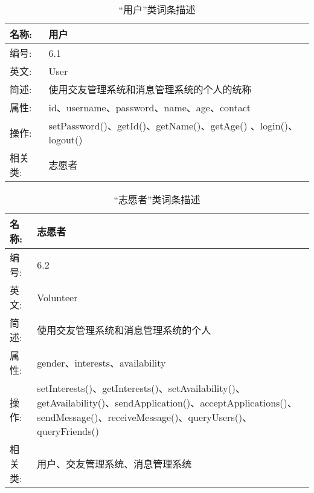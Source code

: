 \begin{table}[H]  
\caption{“用户”类词条描述}  
\begin{center}  
    \begin{tabular}{l p{11cm}} 
        \hline
        \quad 名称:  &  用户 \\
        \hline
        \quad 编号:  & 6.1 \\
        \hline
        \quad 英文:  &  User \\
        \hline
        \quad 简述:  & 使用交友管理系统和消息管理系统的个人的统称 \\
        \hline
        \quad 属性:  & id、username、password、name、age、contact \\
        \hline
        \quad 操作:  & setPassword()、getId()、getName()、getAge() 、login()、logout() \\
        \hline
        \quad 相关类:  & 志愿者 \\
        \hline
    \end{tabular}
\end{center}
\end{table}

\begin{table}[H]  
\caption{“志愿者”类词条描述}  
\begin{center}  
    \begin{tabular}{l p{11cm}} 
        \hline
        \quad 名称:  &  志愿者 \\
        \hline
        \quad 编号:  & 6.2 \\
        \hline
        \quad 英文:  &  Volunteer \\
        \hline
        \quad 简述:  & 使用交友管理系统和消息管理系统的个人 \\
        \hline
        \quad 属性:  & gender、interests、availability \\
        \hline 
        \quad 操作:  & setInterests()、getInterests()、setAvailability()、getAvailability()、sendApplication()、acceptApplications()、sendMessage()、receiveMessage()、queryUsers()、queryFriends()\\
        \hline
        \quad 相关类:  & 用户、交友管理系统、消息管理系统 \\
        \hline
    \end{tabular}
\end{center}
\end{table}


